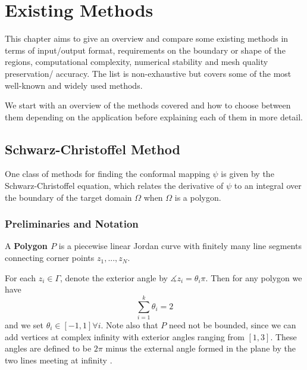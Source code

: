 \section{Existing Methods}
This chapter aims to give an overview and compare some existing methods in terms of input/output format, requirements on the boundary or shape of the regions, computational complexity, numerical stability and mesh quality preservation/ accuracy. The list is non-exhaustive but covers some of the most well-known and widely used methods.

We start with an overview of the methods covered and how to choose between them depending on the application before explaining each of them in more detail.
%


\subsection{Schwarz-Christoffel Method} \label{chap:SchwarzChristoffelMethod}
One class of methods for finding the conformal mapping $\psi$ is given by the Schwarz-Christoffel equation, which relates the derivative of $\psi$ to an integral over the boundary of the target domain $\Omega$ when $\Omega$ is a polygon.
\subsubsection{Preliminaries and Notation}
\begin{definition}
    A \textbf{Polygon $P$} is a piecewise linear Jordan curve with finitely many line segments connecting corner points $z_1, ..., z_N$.
\end{definition} 

For each $z_i\in\Gamma$, denote the exterior angle by $\measuredangle z_i=\theta_i\pi$. Then for any polygon we have $$\sum_{i=1}^{k} \theta_i = 2$$ and we set $\theta_i\in[-1,1]\forall i$. 
Note also that $P$ need not be bounded, since we can add vertices at complex infinity with exterior angles ranging from $[1,3]$. 
These angles are defined to be $2\pi$ minus the external angle formed in the plane by the two lines meeting at infinity \cite[Fig. 1 and 2]{Trefethen1980_SCnumericalcomputation}. 


